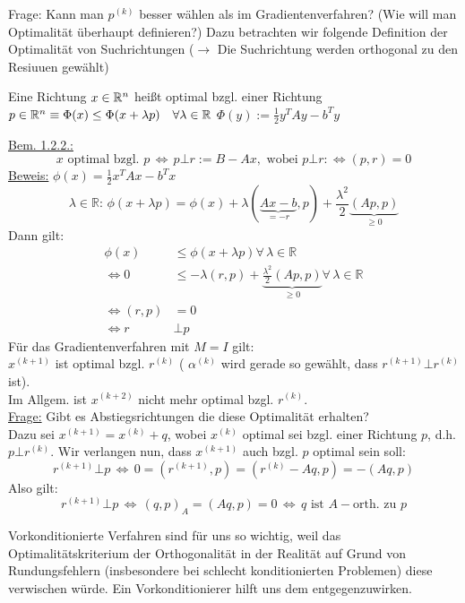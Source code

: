 Frage: Kann man $p^{(k)}$ besser wählen als im Gradientenverfahren? (Wie will man Optimalität überhaupt definieren?) Dazu betrachten wir folgende Definition der Optimalität von Suchrichtungen ($\to$ Die Suchrichtung werden orthogonal zu den Resiuuen gewählt)

\begin{definition}
  Eine Richtung $x\in \mathbb{R}^n$ heißt optimal bzgl. einer Richtung $p\in \mathbb{R}^n \equiv \Phi(x) \leq \Phi(x+\lambda p) \quad \forall \lambda \in \mathbb{R}$
  $\Phi(y):= \frac 1 2 y^TAy - b^Ty$
\end{definition}



\underline{Bem. 1.2.2.:}
\[ x \text{ optimal bzgl. } p \, \Leftrightarrow \, p \bot r := B-Ax, \text{ wobei } p \bot r : \Leftrightarrow (p,r)=0 \]
\underline{Beweis:} $ \phi (x)=\frac{1}{2} x^TAx-b^Tx $\\
\[ \lambda \in\mathbb{R} : \, \phi (x + \lambda p) = \phi(x) + \lambda (\underbrace{Ax-b}_{=-r},p)+ \frac{\lambda^2}{2}\underbrace{(Ap,p)}_{\geq 0} \]
Dann gilt:
\begin{align*}
	\phi(x) &\leq \phi(x+\lambda p ) \forall \, \lambda \in\mathbb{R} \\
\Leftrightarrow 0 & \leq -\lambda (r,p)+\underbrace{\frac{\lambda^2}{2}(Ap,p)}_{\geq 0} \forall \, \lambda \in \mathbb{R} \\
\Leftrightarrow (r,p) &=0 \\
\Leftrightarrow r & \bot p
\end{align*}
Für das Gradientenverfahren mit $M=I$ gilt:\\
$x^{(k+1)}$ ist optimal bzgl. $r^{(k)}$ ( $\alpha^{(k)}$ wird gerade so gewählt, dass $r^{(k+1)} \bot r^{(k)}$ ist).\\
Im Allgem. ist $x^{(k+2)}$ nicht mehr optimal bzgl. $r^{(k)}$.\\
\underline{Frage:} Gibt es Abstiegsrichtungen die diese Optimalität erhalten?\\
Dazu sei $x^{(k+1)}=x^{(k)}+q$, wobei $x^{(k)}$ optimal sei bzgl. einer Richtung $p$, d.h. $p \bot r^{(k)}$. Wir verlangen nun, dass $x^{(k+1)}$ auch bzgl. $p$ optimal sein soll:
\[ r^{(k+1)} \bot p \, \Leftrightarrow \, 0 = (r^{(k+1)},p) = (r^{(k)}-Aq,p)=-(Aq,p) \]
Also gilt:
\[ r^{(k+1)} \bot p \, \Leftrightarrow \, (q,p)_A=(Aq,p)=0 \, \Leftrightarrow \, q \text{ ist $A-$orth. zu } p \]

\begin{bemerkung}
  Vorkonditionierte Verfahren sind für uns so wichtig, weil das Optimalitätskriterium der Orthogonalität in der Realität auf Grund von Rundungsfehlern (insbesondere bei schlecht konditionierten Problemen) diese verwischen würde. Ein Vorkonditionierer hilft uns dem entgegenzuwirken.
\end{bemerkung}

